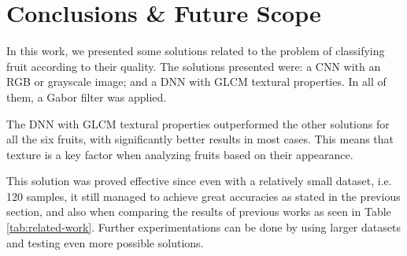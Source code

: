 \documentclass[../main.tex]{subfile}
\begin{document}
\section{Conclusions \& Future Scope} \label{sec:conclusions-&-future-scope}

In this work, we presented some solutions related to the problem of classifying fruit according to their quality. The solutions presented were: a CNN with an RGB or grayscale image; and a DNN with GLCM textural properties. In all of them, a Gabor filter was applied.

The DNN with GLCM textural properties outperformed the other solutions for all the six fruits, with significantly better results in most cases. This means that texture is a key factor when analyzing fruits based on their appearance.



This solution was proved effective since even with a relatively small dataset, i.e. 120 samples, it still managed to achieve great accuracies as stated in the previous section, and also when comparing the results of previous works as seen in Table \ref{tab:related-work}. Further experimentations can be done by using larger datasets and testing even more possible solutions.
\end{document}
